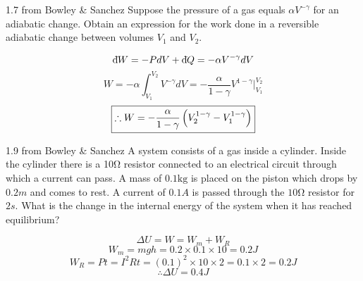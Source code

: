         \begin{eocproblem*}{1.7 from Bowley \& Sanchez}
            Suppose the pressure of a gas equals $\alpha V^{-\gamma}$ for an adiabatic change. Obtain an expression for the work done in a reversible adiabatic change between volumes $V_1$ and $V_2$. 
        \end{eocproblem*}
        
        \begin{equation}
            \text{d}\hspace*{-0.13em}\bar{}\hspace*{0.1em} W = -PdV + \text{d}\hspace*{-0.13em}\bar{}\hspace*{0.1em} Q = -\alpha V^{-\gamma}dV
        \end{equation}
        \begin{equation}
            W = -\alpha\int_{V_1}^{V_2}V^{-\gamma}dV = -\frac{\alpha}{1-\gamma}V^{1-\gamma}\bigg|_{V_1}^{V_2}
        \end{equation}
        \begin{equation}
            \boxed{\therefore W = -\frac{\alpha}{1-\gamma}\left( V_2^{1-\gamma}-V_1^{1-\gamma} \right)}
        \end{equation}
\newpage
        \begin{eocproblem*}{1.9 from Bowley \& Sanchez}
            A system consists of a gas inside a cylinder. Inside the cylinder there is a 10$\si{\ohm}$ resistor connected to an electrical circuit through which a current can pass. A mass of $0.1\si{\kilo\gram}$ is placed on the piston which drops by $0.2\si{m}$ and comes to rest. A current of $0.1\si{A}$ is passed through the $10\si{\ohm}$ resistor for $2\si{s}$. What is the change in the internal energy of the system when it has reached equilibrium?
        \end{eocproblem*}
        \begin{equation}
            \Delta U = W = W_m+W_R
        \end{equation}
        \begin{equation}
            W_m = mgh = 0.2\times 0.1 \times 10 = 0.2\si{J}
        \end{equation}
        \begin{equation}
            W_R = Pt = I^2Rt = (0.1)^2\times10\times2=0.1\times2=0.2\si{J}
        \end{equation}
        \begin{equation}
            \boxed{\therefore \Delta U = 0.4\si{J}}
        \end{equation}
        

